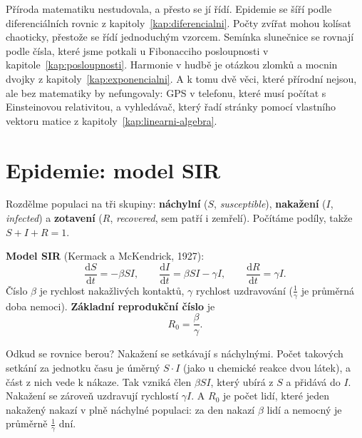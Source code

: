 \label{kap:priroda}

Příroda matematiku nestudovala, a přesto se jí řídí. Epidemie se šíří podle diferenciálních rovnic z kapitoly~\ref{kap:diferencialni}. Počty zvířat mohou kolísat chaoticky, přestože se řídí jednoduchým vzorcem. Semínka slunečnice se rovnají podle čísla, které jsme potkali u Fibonacciho posloupnosti v kapitole~\ref{kap:posloupnosti}. Harmonie v hudbě je otázkou zlomků a mocnin dvojky z kapitoly~\ref{kap:exponencialni}. A k tomu dvě věci, které přírodní nejsou, ale bez matematiky by nefungovaly: GPS v telefonu, které musí počítat s Einsteinovou relativitou, a vyhledávač, který řadí stránky pomocí vlastního vektoru matice z kapitoly~\ref{kap:linearni-algebra}.

\section{Epidemie: model SIR}

Rozdělme populaci na tři skupiny: \textbf{náchylní} ($S$, \textit{susceptible}), \textbf{nakažení} ($I$, \textit{infected}) a \textbf{zotavení} ($R$, \textit{recovered}, sem patří i zemřelí). Počítáme podíly, takže $S + I + R = 1$.

\begin{definitionbox}
  \textbf{Model SIR} (Kermack a McKendrick, 1927):
  \begin{equation*}
    \frac{\mathrm{d}S}{\mathrm{d}t} = -\beta SI,\qquad
    \frac{\mathrm{d}I}{\mathrm{d}t} = \beta SI - \gamma I,\qquad
    \frac{\mathrm{d}R}{\mathrm{d}t} = \gamma I.
  \end{equation*}
  Číslo $\beta$ je rychlost nakažlivých kontaktů, $\gamma$ rychlost uzdravování ($\frac{1}{\gamma}$ je průměrná doba nemoci). \textbf{Základní reprodukční číslo} je
  \begin{equation*}
    R_0 = \frac{\beta}{\gamma}.
  \end{equation*}
\end{definitionbox}

Odkud se rovnice berou? Nakažení se setkávají s náchylnými. Počet takových setkání za jednotku času je úměrný $S\cdot I$ (jako u chemické reakce dvou látek), a část z nich vede k nákaze. Tak vzniká člen $\beta SI$, který ubírá z $S$ a přidává do $I$. Nakažení se zároveň uzdravují rychlostí $\gamma I$. A $R_0$ je počet lidí, které jeden nakažený nakazí v plně náchylné populaci: za den nakazí $\beta$ lidí a nemocný je průměrně $\frac{1}{\gamma}$ dní.

